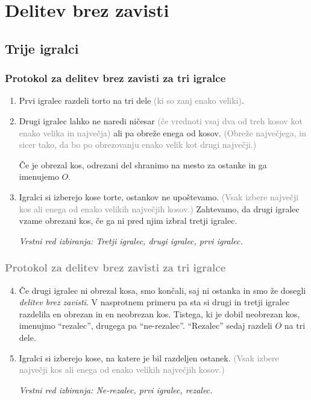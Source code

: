 \documentclass{beamer}
\begin{document}
\section{Delitev brez zavisti}
\subsection{Trije igralci}
\begin{frame}
\frametitle{Protokol za delitev brez zavisti za tri igralce}

\begin{enumerate}

\item Prvi igralec razdeli torto na tri dele \textcolor{gray}{(ki so zanj enako veliki)}.

\item Drugi igralec lahko ne naredi ničesar \textcolor{gray}{(če vrednoti vsaj dva od treh kosov kot enako velika in največja)}
ali pa obreže enega od kosov. \textcolor{gray}{(Obreže največjega, in sicer tako, da bo po obrezovanju enako velik kot drugi največji.)}

Če je obrezal kos, odrezani del shranimo na mesto za ostanke in ga imenujemo $O$.

\item Igralci si izberejo kose torte, ostankov ne upoštevamo. \textcolor{gray}{(Vsak izbere največji kos ali enega od enako velikih največjih kosov.)} Zahtevamo, da drugi igralec vzame obrezani kos, če ga ni pred njim izbral tretji igralec.

\textsl{Vrstni red izbiranja: Tretji igralec, drugi igralec, prvi igralec.}

\end{enumerate}
\end{frame}
\begin{frame}
\frametitle{\textcolor{gray}{Protokol za delitev brez zavisti za tri igralce}}
\begin{enumerate}
\setcounter{enumi}{3}

\item Če drugi igralec ni obrezal kosa, smo končali, saj ni ostanka in smo že dosegli {\em delitev brez zavisti}. V nasprotnem primeru pa sta si drugi in tretji igralec razdelila en obrezan in en neobrezan kos. Tistega, ki je dobil neobrezan kos, imenujmo ``rezalec'', drugega pa ``ne-rezalec''. ``Rezalec'' sedaj razdeli $O$ na tri dele.

\item Igralci si izberejo kose, na katere je bil razdeljen ostanek. \textcolor{gray}{(Vsak izbere največji kos ali enega od enako velikih največjih kosov.)}

\textsl{Vrstni red izbiranja: Ne-rezalec, prvi igralec, rezalec.}

\end{enumerate}

\end{frame}
\end{document}
